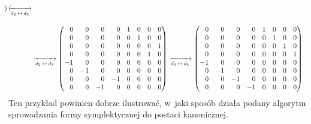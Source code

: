 \documentclass[a4paper,11pt]{article}
\begin{document}
\begin{equation}
\begin{split}
\begin{pmatrix}
      \end{pmatrix}
      \xrightarrow[ d_{ 2 } \, \leftrightarrow \, d_{ 3 } ]{ } \\[1em]
    &\xrightarrow[ d_{ 2 } \, \leftrightarrow \, d_{ 3 } ]{ }
      \begin{pmatrix}
        \hphantom{-} 0 & \hphantom{-} 0 & \hphantom{-} 0 & \hphantom{-} 0
        & 1 & 0 & 0 & 0 \\
        \hphantom{-} 0 & \hphantom{-} 0 & \hphantom{-} 0 & \hphantom{-} 0
        & 0 & 1 & 0 & 0 \\
        \hphantom{-} 0 & \hphantom{-} 0 & \hphantom{-} 0 & \hphantom{-} 0
        & 0 & 0 & 0 & 1 \\
        \hphantom{-} 0 & \hphantom{-} 0 & \hphantom{-} 0 & \hphantom{-} 0
        & 0 & 0 & 1 & 0 \\
        -1 & \hphantom{-} 0 & \hphantom{-} 0 & \hphantom{-} 0 & 0 & 0 & 0
                    & 0 \\
        \hphantom{-} 0 & -1 & \hphantom{-} 0 & \hphantom{-} 0 & 0 & 0 & 0
                    & 0 \\
        \hphantom{-} 0 & \hphantom{-} 0 & \hphantom{-} 0 & -1 & 0 & 0 & 0
                    & 0 \\
        \hphantom{-} 0 & \hphantom{-} 0 & -1 & \hphantom{-} 0 & 0 & 0 & 0
                    & 0
      \end{pmatrix}
      \xrightarrow[ d_{ 3 } \, \leftrightarrow \, d_{ 4 } ]{}
      \begin{pmatrix}
        \hphantom{-} 0 & \hphantom{-} 0 & \hphantom{-} 0
        & \hphantom{-} 0 & 1 & 0 & 0 & 0 \\
        \hphantom{-} 0 & \hphantom{-} 0 & \hphantom{-} 0
        & \hphantom{-} 0 & 0 & 1 & 0 & 0 \\
        \hphantom{-} 0 & \hphantom{-} 0 & \hphantom{-} 0
        & \hphantom{-} 0 & 0 & 0 & 1 & 0 \\
        \hphantom{-} 0 & \hphantom{-} 0 & \hphantom{-} 0
        & \hphantom{-} 0 & 0 & 0 & 0 & 1 \\
        -1 & \hphantom{-} 0 & \hphantom{-} 0 & \hphantom{-} 0 & 0
                             & 0 & 0 & 0 \\
        \hphantom{-} 0 & -1 & \hphantom{-} 0 & \hphantom{-} 0 & 0
                             & 0 & 0 & 0 \\
        \hphantom{-} 0 & \hphantom{-} 0 & -1 & \hphantom{-} 0 & 0 & 0
                                 & 0 & 0 \\
        \hphantom{-} 0 & \hphantom{-} 0 & \hphantom{-} 0 & -1 & 0 & 0
        & 0 & 0 \\
      \end{pmatrix}
  \end{split}
\end{equation}
Ten przykład powinien dobrze ilustrować, w~jaki sposób działa podany
algorytm sprowadzania formy symplektycznej do postaci kanonicznej.
\end{document}
